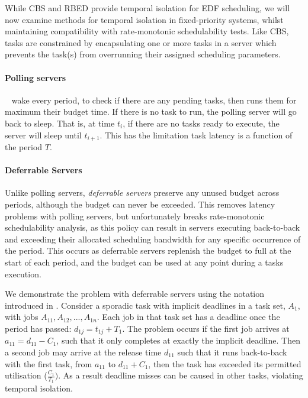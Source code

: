 While \gls{CBS} and \gls{RBED} provide temporal isolation for \gls{EDF} scheduling, we will now
examine methods for temporal isolation in fixed-priority systems, whilst maintaining compatibility
with rate-monotonic schedulability tests.  Like \gls{CBS}, tasks are constrained by encapsulating
one or more tasks in a server which prevents the task(s) from overrunning their assigned scheduling
parameters.

\paragraph{Polling servers}\label{p:polling-servers}~\citep{Lehoczky_LS_87} wake every period,
to check if there are any pending tasks, then runs them for maximum their budget time. If there is no
task to run, the polling server will go back to sleep. That is, at time $t_{i}$, if there are no
tasks ready to execute, the server will sleep until $t_{i+1}$. This has the limitation task latency
is a function of the period $T$.

\paragraph{Deferrable Servers}\label{p:ds} Unlike polling servers, \emph{deferrable
servers}\citep{Lehoczky_LS_87, Strosnider_LS_95} preserve any unused budget across periods, although
the budget can never be exceeded.  This removes latency problems with polling servers, but
unfortunately breaks rate-monotonic schedulability analysis, as this policy can result in servers
executing back-to-back and exceeding their allocated scheduling bandwidth for any specific occurrence of
the period.  This occurs as deferrable servers replenish the budget to full at the start of each
period, and the budget can be used at any point during a tasks execution. 

We demonstrate the problem with deferrable servers using the notation introduced in
. Consider a sporadic task with implicit deadlines in a task set, 
$A_{1}$, with jobs $A_{11}, A_{12}, ..., A_{1n}$. Each job in that task set has a deadline once the
period has passed: $d_{1j} = t_{1j} + T_{1}$. The problem occurs if the first job arrives at $a_{11}
= d_{11} - C_{1}$, such that it only completes at exactly the implicit deadline.  
Then a second job may arrive at the release time $d_{11}$ such that it runs back-to-back with the first
task, from $a_11$ to $d_{11} + C_{1}$, then the task has exceeded its permitted utilisation 
($\frac{C_{1}}{T_{1}})$. As a result deadline misses can be caused in other
tasks, violating temporal isolation.

